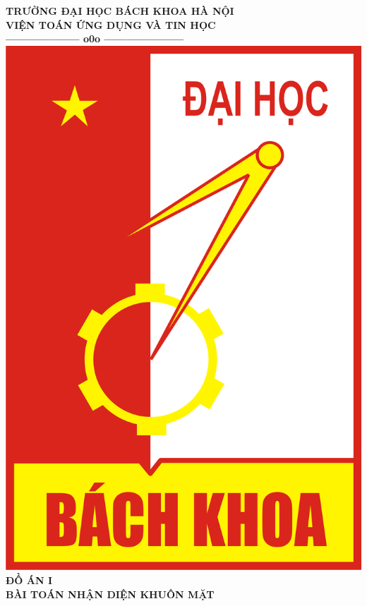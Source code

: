 \documentclass[12pt]{extreport}
\begin{document}
\thispagestyle{empty}
\thisfancypage{
	\setlength{\fboxsep}{0pt}
	\fbox}{}

\begin{center}
	
	{\fontsize{13pt}{1}\selectfont\textbf{TRƯỜNG ĐẠI HỌC BÁCH KHOA HÀ NỘI}}
	\\
	{\fontsize{13pt}{1}\selectfont\textbf{VIỆN TOÁN ỨNG DỤNG VÀ TIN HỌC}}
	\\		
	\textbf{--------------------  o0o  ---------------------}\\[1cm]
	\includegraphics[scale=0.2]{logo} \\[1.2cm]
	\textbf{{\large ĐỒ ÁN I}}
\textbf{}\\[1cm]
\textbf{{\large BÀI TOÁN NHẬN DIỆN KHUÔN MẶT}}\\[0.2cm]
\end{center}
\end{document}
